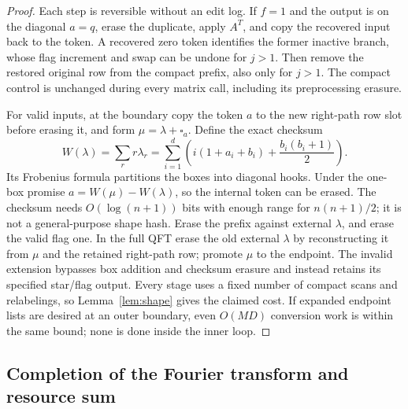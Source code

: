 \documentclass[11pt]{article}
\theoremstyle{definition}
\begin{document}
\begin{proof}
Each step is reversible without an edit log. If $f=1$ and the output is
on the diagonal $a=q$, erase the duplicate, apply $A^T$, and copy the recovered input
back to the token. A recovered zero token identifies the former inactive
branch, whose flag increment and swap can be undone for $j>1$. Then remove
the restored original row from the compact prefix, also only for $j>1$.
The compact control is
unchanged during every matrix call, including its preprocessing erasure.

For valid inputs, at the boundary copy the token $a$ to the new right-path row slot before
erasing it, and form $\mu=\lambda+\square_a$. Define the exact checksum
\[
 W(\lambda)=\sum_r r\lambda_r
 =\sum_{i=1}^{d}\left(i(1+a_i+b_i)+\frac{b_i(b_i+1)}2\right).
\]
Its Frobenius formula partitions the boxes into diagonal hooks.
Under the one-box promise $a=W(\mu)-W(\lambda)$, so the internal token
can be erased. The checksum needs $O(\log(n+1))$ bits with enough range
for $n(n+1)/2$; it is not a general-purpose shape hash.
Erase the prefix against external $\lambda$, and erase the valid flag one.
In the full QFT erase the old external $\lambda$ by reconstructing it
from $\mu$ and the retained right-path row; promote $\mu$ to the endpoint.
The invalid extension bypasses box addition and checksum erasure and
instead retains its specified star/flag output.
Every stage uses a fixed number of compact scans and relabelings, so
Lemma~\ref{lem:shape} gives the claimed cost. If expanded endpoint lists
are desired at an outer boundary, even $O(MD)$ conversion work is within
the same bound; none is done inside the inner loop.
\end{proof}

\subsection{Completion of the Fourier transform and resource sum}
\end{document}
